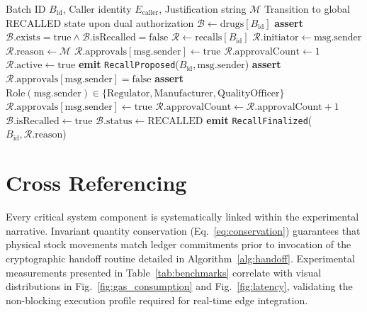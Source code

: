 \documentclass[11pt,a4paper]{article}
\begin{document}
\begin{algorithm}[htbp]
\caption{Multi-Party 2-of-$N$ Consensus Recall Execution}
\label{alg:recall}
\begin{algorithmic}[1]
\Require Batch ID $B_{\text{id}}$, Caller identity $E_{\text{caller}}$, Justification string $\mathcal{M}$
\Ensure Transition to global RECALLED state upon dual authorization
\State $\mathcal{B} \gets \text{drugs}[B_{\text{id}}]$
\State \textbf{assert} $\mathcal{B}.\text{exists} = \text{true} \land \mathcal{B}.\text{isRecalled} = \text{false}$
\State $\mathcal{R} \gets \text{recalls}[B_{\text{id}}]$
    \State $\mathcal{R}.\text{initiator} \gets \text{msg.sender}$
    \State $\mathcal{R}.\text{reason} \gets \mathcal{M}$
    \State $\mathcal{R}.\text{approvals}[\text{msg.sender}] \gets \text{true}$
    \State $\mathcal{R}.\text{approvalCount} \gets 1$
    \State $\mathcal{R}.\text{active} \gets \text{true}$
    \State \textbf{emit} \texttt{RecallProposed}($B_{\text{id}}, \text{msg.sender}$)
\Else
    \State \textbf{assert} $\mathcal{R}.\text{approvals}[\text{msg.sender}] = \text{false}$
    \State \textbf{assert} $\text{Role}(\text{msg.sender}) \in \{\text{Regulator}, \text{Manufacturer}, \text{QualityOfficer}\}$
    \State $\mathcal{R}.\text{approvals}[\text{msg.sender}] \gets \text{true}$
    \State $\mathcal{R}.\text{approvalCount} \gets \mathcal{R}.\text{approvalCount} + 1$
        \State $\mathcal{B}.\text{isRecalled} \gets \text{true}$
        \State $\mathcal{B}.\text{status} \gets \text{RECALLED}$
        \State \textbf{emit} \texttt{RecallFinalized}($B_{\text{id}}, \mathcal{R}.\text{reason}$)
    \EndIf
\EndIf
\end{algorithmic}
\end{algorithm}

\section{Cross Referencing}
Every critical system component is systematically linked within the experimental narrative. Invariant quantity conservation (Eq.~\ref{eq:conservation}) guarantees that physical stock movements match ledger commitments prior to invocation of the cryptographic handoff routine detailed in Algorithm~\ref{alg:handoff}. Experimental measurements presented in Table~\ref{tab:benchmarks} correlate with visual distributions in Fig.~\ref{fig:gas_consumption} and Fig.~\ref{fig:latency}, validating the non-blocking execution profile required for real-time edge integration.
\end{document}
